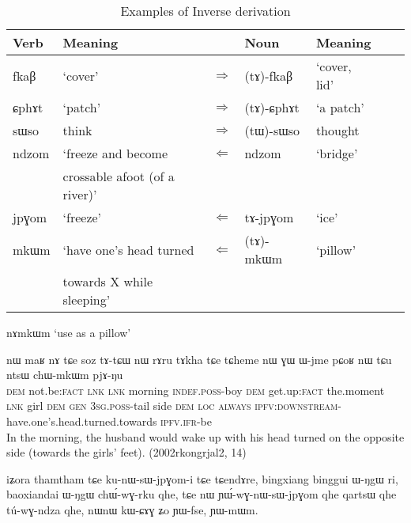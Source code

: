 \documentclass[oldfontcommands,oneside,a4paper,11pt]{article}
\newcommand{\ipa}[1]{{\phon \mbox{#1}}} %
\begin{document}
\begin{table}[H]
\caption{Examples of Inverse derivation} \centering \label{tab:rueckbildung}
\begin{tabular}{lllllll}
\toprule
Verb & Meaning &&Noun & Meaning\\
\midrule
\ipa{fkaβ} & `cover' & $\Rightarrow$ &\ipa{(tɤ)-fkaβ} &`cover, lid' \\
\ipa{ɕphɤt} & `patch'& $\Rightarrow$ &\ipa{(tɤ)-ɕphɤt} & `a patch'  \\
\ipa{sɯso} & think &  $\Rightarrow$ & \ipa{(tɯ)-sɯso} & thought \\
\midrule
\ipa{ndzom} & `freeze and become   &$\Leftarrow$ &\ipa{ndzom} &`bridge' \\
&crossable afoot (of a river)'&&&\\
\ipa{jpɣom} & `freeze' & $\Leftarrow$ &\ipa{tɤ-jpɣom}& `ice' \\
\ipa{mkɯm} & `have one's head turned& $\Leftarrow$ &\ipa{(tɤ)-mkɯm}& `pillow' \\
&   towards X while sleeping' &&&\\
\bottomrule
\end{tabular}
\end{table}

\ipa{nɤmkɯm} `use as a pillow'


\begin{exe}
\ex
\gll 
\ipa{nɯ}  	\ipa{maʁ}  	\ipa{nɤ}  \ipa{tɕe}   \ipa{soz}  	\ipa{tɤ-tɕɯ}  	\ipa{nɯ}  	\ipa{rɤru}  	\ipa{tɤkha}  	\ipa{tɕe}   	\ipa{tɕheme}  	\ipa{nɯ}  	\ipa{ɣɯ}  	\ipa{ɯ-jme}  	\ipa{pɕoʁ}  	\ipa{nɯ}  	\ipa{tɕu}  	\ipa{ntsɯ}  	\ipa{chɯ-mkɯm}  	\ipa{pjɤ-ŋu}   \\
\textsc{dem} not.be:\textsc{fact} \textsc{lnk} \textsc{lnk} morning \textsc{indef.poss}-boy \textsc{dem}  get.up:\textsc{fact} the.moment \textsc{lnk} girl \textsc{dem} \textsc{gen} \textsc{3sg.poss}-tail side \textsc{dem} \textsc{loc} \textsc{always} \textsc{ipfv:downstream}-have.one's.head.turned.towards \textsc{ipfv.ifr}-be \\
\glt In the morning, the husband would wake up with his head turned on the opposite side (towards the girls' feet). (2002rkongrjal2, 14)
\end{exe}


\ipa{iʑora}  	\ipa{thamtham}  	\ipa{tɕe}  	\ipa{ku-nɯ-sɯ-jpɣom-i}  	\ipa{tɕe}  	\ipa{tɕendɤre,}  
\ipa{bingxiang}  	\ipa{binggui}  	\ipa{ɯ-ŋgɯ}  	\ipa{ri,}  	\ipa{baoxiandai}  	\ipa{ɯ-ŋgɯ}  	\ipa{chɯ́-wɣ-rku}  	\ipa{qhe,}  
\ipa{tɕe}  	\ipa{nɯ}  	\ipa{ɲɯ́-wɣ-nɯ-sɯ-jpɣom}  	\ipa{qhe}  	\ipa{qartsɯ}  	\ipa{qhe}  	\ipa{tú-wɣ-ndza}  	\ipa{qhe,}  
\ipa{nɯnɯ}  	\ipa{kɯ-ɕɤɣ}  	\ipa{ʑo}  	\ipa{ɲɯ-fse,}  	\ipa{ɲɯ-mɯm.}  
\end{document}
